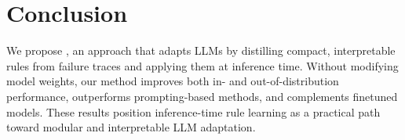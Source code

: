 \section{Conclusion}

We propose \shortname, an approach that adapts LLMs by distilling compact, interpretable rules
from failure traces and applying them at inference time. Without modifying model weights, our
method improves both in- and out-of-distribution performance, outperforms prompting-based
methods, and complements finetuned models. These results position inference-time rule learning
as a practical path toward modular and interpretable LLM adaptation.

